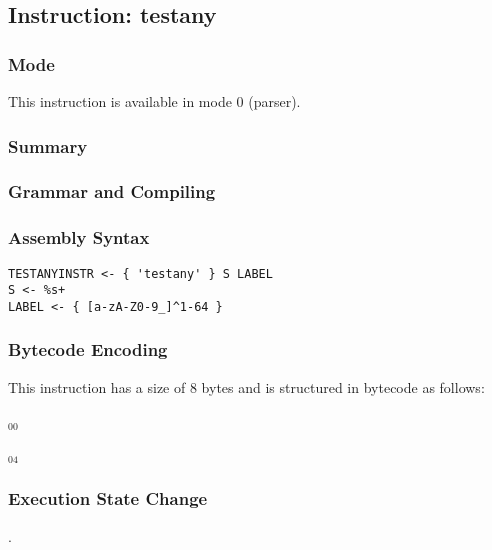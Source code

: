 \subsection{Instruction: testany}

\subsubsection{Mode}
This instruction is available in mode 0 (parser).
\subsubsection{Summary}


\subsubsection{Grammar and Compiling}


\subsubsection{Assembly Syntax}

\begin{myquote}
\begin{verbatim}
TESTANYINSTR <- { 'testany' } S LABEL
S <- %s+
LABEL <- { [a-zA-Z0-9_]^1-64 }
\end{verbatim}
\end{myquote}

\subsubsection{Bytecode Encoding}

This instruction has a size of 8 bytes and is structured in bytecode as follows:

$_{00}$\ 



$_{04}$\ 


\subsubsection{Execution State Change}

.


